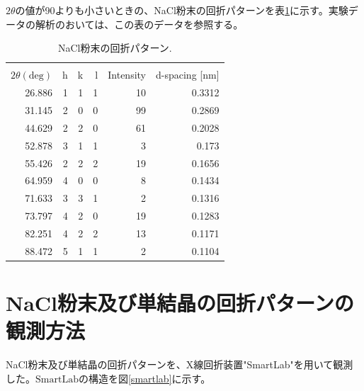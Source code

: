 \documentclass[11pt,a4j,uplatex]{jsarticle}
\begin{document}
$2\theta$の値が90よりも小さいときの、NaCl粉末の回折パターンを表\ref{data}に示す。実験データの解析のおいては、この表のデータを参照する。

\begin{table}[htbp]
 \begin{center}
  \caption{NaCl粉末の回折パターン\cite{powder}.}
  \begin{tabular}{|r|r|r|r|r|r|}  \hline
                           & \multicolumn{3}{c|}{} &   &                                \\
   $2\theta(\mathrm{deg})$ & h                     & k & l & Intensity & d-spacing [nm] \\  \hline \hline
   26.886                  & 1                     & 1 & 1 & 10        & 0.3312         \\
   31.145                  & 2                     & 0 & 0 & 99        & 0.2869         \\
   44.629                  & 2                     & 2 & 0 & 61        & 0.2028         \\
   52.878                  & 3                     & 1 & 1 & 3         & 0.173          \\
   55.426                  & 2                     & 2 & 2 & 19        & 0.1656         \\
   64.959                  & 4                     & 0 & 0 & 8         & 0.1434         \\
   71.633                  & 3                     & 3 & 1 & 2         & 0.1316         \\
   73.797                  & 4                     & 2 & 0 & 19        & 0.1283         \\
   82.251                  & 4                     & 2 & 2 & 13        & 0.1171         \\
   88.472                  & 5                     & 1 & 1 & 2         & 0.1104         \\ \hline
  \end{tabular}
  \label{data}
 \end{center}
\end{table}

\newpage
\section{NaCl粉末及び単結晶の回折パターンの観測方法}

NaCl粉末及び単結晶の回折パターンを、X線回折装置"SmartLab"を用いて観測した。$\mathrm{SmartLab}$の構造を図\ref{smartlab}に示す。
\end{document}
